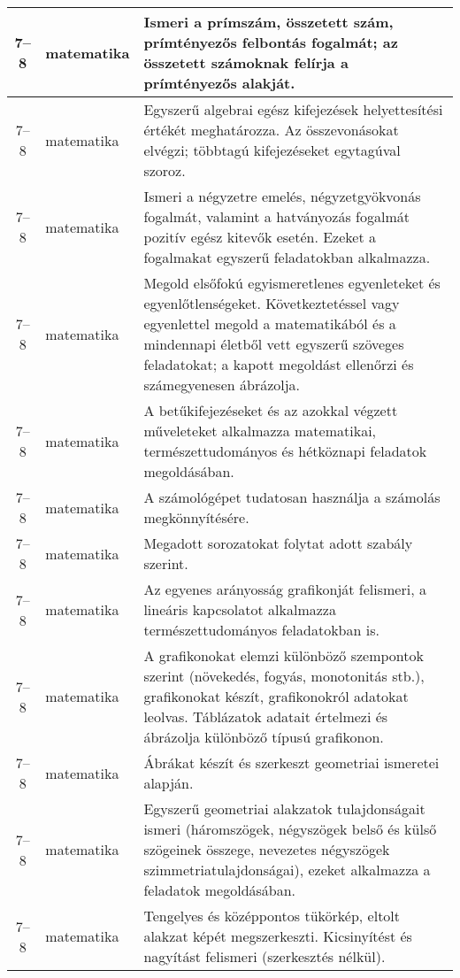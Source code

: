 \begin{small}
\begin{longtable}{c | p{2cm} |  p{11cm} }
              7--8 & matematika & Ismeri a prímszám, összetett szám, prímtényezős felbontás fogalmát; az összetett számoknak felírja a prímtényezős alakját. \\ \hline
              7--8 & matematika & Egyszerű algebrai egész kifejezések helyettesítési értékét meghatározza. Az összevonásokat elvégzi; többtagú kifejezéseket egytagúval szoroz. \\ \hline
              7--8 & matematika & Ismeri a négyzetre emelés, négyzetgyökvonás fogalmát, valamint a hatványozás fogalmát pozitív egész kitevők esetén. Ezeket a fogalmakat egyszerű feladatokban alkalmazza. \\ \hline
              7--8 & matematika & Megold elsőfokú egyismeretlenes egyenleteket és egyenlőtlenségeket. Következtetéssel vagy egyenlettel megold a matematikából és a mindennapi életből vett egyszerű szöveges feladatokat; a kapott megoldást ellenőrzi és számegyenesen ábrázolja. \\ \hline
              7--8 & matematika & A betűkifejezéseket és az azokkal végzett műveleteket alkalmazza matematikai, természettudományos és hétköznapi feladatok megoldásában. \\ \hline
              7--8 & matematika & A számológépet tudatosan használja a számolás megkönnyítésére. \\ \hline
              7--8 & matematika & Megadott sorozatokat folytat adott szabály szerint. \\ \hline
              7--8 & matematika & Az egyenes arányosság grafikonját felismeri, a lineáris kapcsolatot alkalmazza természettudományos feladatokban is. \\ \hline
              7--8 & matematika & A grafikonokat elemzi különböző szempontok szerint (növekedés, fogyás, monotonitás stb.), grafikonokat készít, grafikonokról adatokat leolvas. Táblázatok adatait értelmezi és ábrázolja különböző típusú grafikonon. \\ \hline
              7--8 & matematika & Ábrákat készít és szerkeszt geometriai ismeretei alapján. \\ \hline
              7--8 & matematika & Egyszerű geometriai alakzatok tulajdonságait ismeri (háromszögek, négyszögek belső és külső szögeinek összege, nevezetes négyszögek szimmetriatulajdonságai), ezeket alkalmazza a feladatok megoldásában. \\ \hline
              7--8 & matematika & Tengelyes és középpontos tükörkép, eltolt alakzat képét megszerkeszti. Kicsinyítést és nagyítást felismeri (szerkesztés nélkül). \\ \hline

\end{longtable}
\end{small}
